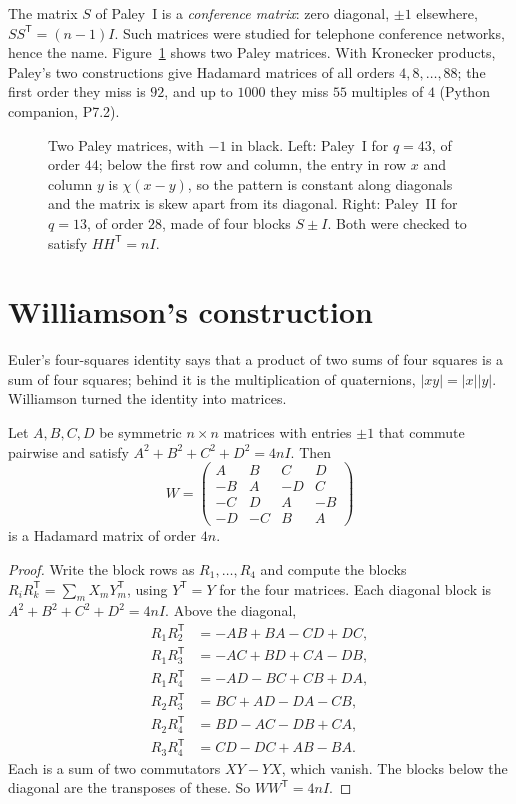 The matrix $S$ of Paley~I is a \emph{conference matrix}: zero diagonal, $\pm1$ elsewhere, $SS^{\mathsf T}=(n-1)I$. Such matrices were studied for
telephone conference networks, hence the name. Figure~\ref{fig:paley} shows two Paley matrices. With Kronecker products, Paley's two constructions give
Hadamard matrices of all orders $4,8,\dots,88$; the first order they miss is $92$, and up to $1000$ they miss $55$ multiples of $4$ (Python
companion, P7.2).

\begin{figure}[ht]
\centering
{}
\caption{Two Paley matrices, with $-1$ in black. Left: Paley~I for $q=43$, of order $44$; below the first row and column, the entry in row $x$ and
column $y$ is $\chi(x-y)$, so the pattern is constant along diagonals and the matrix is skew apart from its diagonal. Right: Paley~II for $q=13$, of
order $28$, made of four blocks $S\pm I$. Both were checked to satisfy $HH^{\mathsf T}=nI$.}
\label{fig:paley}
\end{figure}

\section{Williamson's construction}

Euler's four-squares identity says that a product of two sums of four squares is a sum of four squares; behind it is the multiplication of
quaternions, $|xy|=|x||y|$. Williamson turned the identity into matrices.

\begin{theorem}[Williamson, 1944]\label{thm:williamson}
Let $A,B,C,D$ be symmetric $n\times n$ matrices with entries $\pm1$ that commute pairwise and satisfy $A^2+B^2+C^2+D^2=4nI$. Then
\[
W=\begin{pmatrix}A&B&C&D\\-B&A&-D&C\\-C&D&A&-B\\-D&-C&B&A\end{pmatrix}
\]
is a Hadamard matrix of order $4n$.
\end{theorem}
\begin{proof}
Write the block rows as $R_1,\dots,R_4$ and compute the blocks $R_iR_k^{\mathsf T}=\sum_mX_mY_m^{\mathsf T}$, using $Y^{\mathsf T}=Y$ for the four
matrices. Each diagonal block is $A^2+B^2+C^2+D^2=4nI$. Above the diagonal,
\begin{align*}
R_1R_2^{\mathsf T}&=-AB+BA-CD+DC,\\ R_1R_3^{\mathsf T}&=-AC+BD+CA-DB,\\
R_1R_4^{\mathsf T}&=-AD-BC+CB+DA,\\ R_2R_3^{\mathsf T}&=BC+AD-DA-CB,\\
R_2R_4^{\mathsf T}&=BD-AC-DB+CA,\\ R_3R_4^{\mathsf T}&=CD-DC+AB-BA.
\end{align*}
Each is a sum of two commutators $XY-YX$, which vanish. The blocks below the diagonal are the transposes of these. So $WW^{\mathsf T}=4nI$.
\end{proof}

